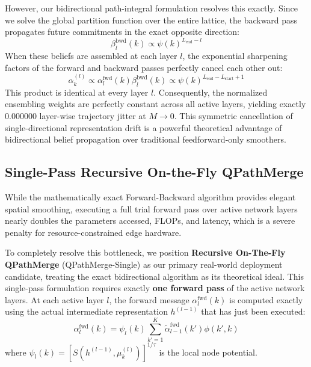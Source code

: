 However, our bidirectional path-integral formulation resolves this exactly. Since we solve the global partition function over the entire lattice, the backward pass propagates future commitments in the exact opposite direction:
\begin{equation}
    \beta^{\text{bwd}}_l(k) \propto \psi(k)^{L_{\text{end}} - l}
\end{equation}
When these beliefs are assembled at each layer $l$, the exponential sharpening factors of the forward and backward passes perfectly cancel each other out:
\begin{equation}
    \alpha^{(l)}_k \propto \alpha^{\text{fwd}}_l(k) \beta^{\text{bwd}}_l(k) \propto \psi(k)^{L_{\text{end}} - L_{\text{start}} + 1}
\end{equation}
This product is identical at every layer $l$. Consequently, the normalized ensembling weights are perfectly constant across all active layers, yielding exactly $0.000000$ layer-wise trajectory jitter at $M \to 0$. This symmetric cancellation of single-directional representation drift is a powerful theoretical advantage of bidirectional belief propagation over traditional feedforward-only smoothers.

\subsection{Single-Pass Recursive On-the-Fly QPathMerge}
\label{subsec:single_pass}

While the mathematically exact Forward-Backward algorithm provides elegant spatial smoothing, executing a full trial forward pass over active network layers nearly doubles the parameters accessed, FLOPs, and latency, which is a severe penalty for resource-constrained edge hardware.

To completely resolve this bottleneck, we position \textbf{Recursive On-The-Fly QPathMerge} (QPathMerge-Single) as our primary real-world deployment candidate, treating the exact bidirectional algorithm as its theoretical ideal. This single-pass formulation requires exactly \textbf{one forward pass} of the active network layers. At each active layer $l$, the forward message $\alpha^{\text{fwd}}_l(k)$ is computed exactly using the actual intermediate representation $h^{(l-1)}$ that has just been executed:
\begin{equation}
    \alpha^{\text{fwd}}_l(k) = \psi_l(k) \sum_{k'=1}^K \tilde{\alpha}^{\text{fwd}}_{l-1}(k') \phi(k', k)
\end{equation}
where $\psi_l(k) = [S(h^{(l-1)}, \mu_k^{(l)})]^{1/\tau}$ is the local node potential.

